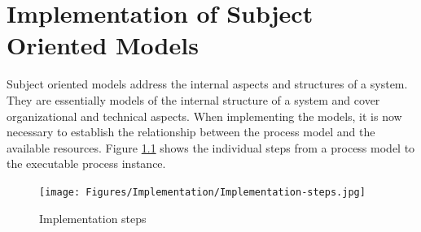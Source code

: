 %





\chapter{Implementation of Subject Oriented Models}




Subject oriented models address the internal aspects and structures of a system. They are essentially models of the internal structure of a system and cover organizational and technical aspects. When implementing the models, it is now necessary to establish the relationship between the process model and the available resources. Figure \ref{fig:Implementation-steps} shows the individual steps from a process model to the executable process instance.

\begin{figure}[h]
	\centering
	\texttt{[image: Figures/Implementation/Implementation-steps.jpg]}
	\caption[Implementation steps]{Implementation steps}
	\label{fig:Implementation-steps}
\end{figure}
 
